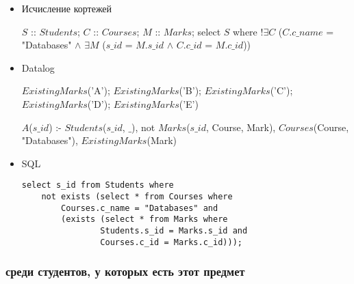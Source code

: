 \documentclass[12pt,a4paper,oneside]{article}
\begin{document}
\begin{itemize}

\item Исчисление кортежей

$S$ :: $Students$; $C$ :: $Courses$; $M$ :: $Marks$; select $S$ where $! \exists C$ ($C.c\_name$ = "Databases" $\wedge$ $\exists M$ ($s\_id$ = $M.s\_id$ $\wedge$ $C.c\_id$ = $M.c\_id$))

\item Datalog

$ExistingMarks$('A');
$ExistingMarks$('B');
$ExistingMarks$('C');
$ExistingMarks$('D');
$ExistingMarks$('E')

$A$($s\_id$) :- $Students$($s\_id$, $\_$), not $Marks$($s\_id$, Course, Mark), $Courses$(Course, "Databases"), $ExistingMarks$(Mark)

\item SQL

\begin{lstlisting}[label=task2a,caption={Задание 2(а)}]
select s_id from Students where
    not exists (select * from Courses where
        Courses.c_name = "Databases" and
        (exists (select * from Marks where
                Students.s_id = Marks.s_id and
                Courses.c_id = Marks.c_id)));
\end{lstlisting}

\end{itemize}

\subsubsection{среди студентов, у которых есть этот предмет}
\end{document}
